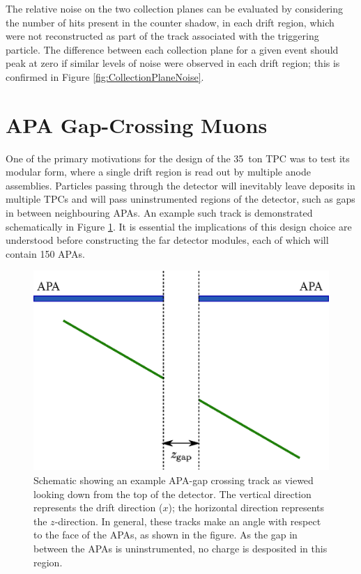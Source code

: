 The relative noise on the two collection planes can be evaluated by considering the number of hits present in the counter shadow, in each drift region, which were not reconstructed as part of the track associated with the triggering particle.  The difference between each collection plane for a given event should peak at zero if similar levels of noise were observed in each drift region; this is confirmed in Figure \ref{fig:CollectionPlaneNoise}.


\section{APA Gap-Crossing Muons}\label{sec:APAGapCrossing}

One of the primary motivations for the design of the 35~ton TPC was to test its modular form, where a single drift region is read out by multiple anode assemblies.  Particles passing through the detector will inevitably leave deposits in multiple TPCs and will pass uninstrumented regions of the detector, such as gaps in between neighbouring APAs.  An example such track is demonstrated schematically in Figure \ref{fig:APAGapCrosser}.  It is essential the implications of this design choice are understood before constructing the far detector modules, each of which will contain 150 APAs.

\begin{figure}
  \centering
  \includegraphics[width=12cm]{apa_gap.eps}
  \caption{Schematic showing an example APA-gap crossing track as viewed looking down from the top of the detector.  The vertical direction represents the drift direction ($x$); the horizontal direction represents the $z$-direction.  In general, these tracks make an angle with respect to the face of the APAs, as shown in the figure.  As the gap in between the APAs is uninstrumented, no charge is desposited in this region.}
  \label{fig:APAGapCrosser}
\end{figure}

